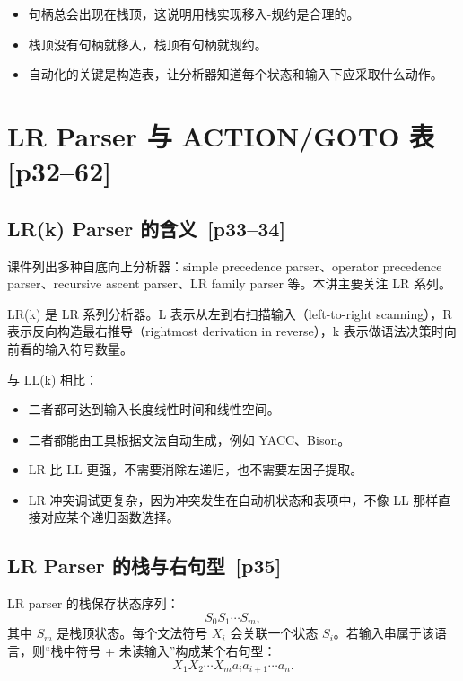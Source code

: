 \documentclass[UTF8,fontset=none,11pt]{ctexart}
\newenvironment{defbox}[1][]{%
  \par\medskip\noindent{\color{defrule}\rule{\linewidth}{1.1pt}}\par\nopagebreak
  \noindent{\bfseries\color{defrule}#1}\par\nopagebreak\smallskip}%
  {\par\nopagebreak\smallskip\noindent{\color{defrule}\rule{\linewidth}{0.4pt}}\par\medskip}
\newcommand{\pg}[1]{\texorpdfstring{{\small\color{graytext}\,[p#1]}}{ [p#1]}}
\begin{document}
\begin{itemize}
  \item 句柄总会出现在栈顶，这说明用栈实现移入-规约是合理的。
  \item 栈顶没有句柄就移入，栈顶有句柄就规约。
  \item 自动化的关键是构造表，让分析器知道每个状态和输入下应采取什么动作。
\end{itemize}

\section{LR Parser 与 ACTION/GOTO 表 \pg{32--62}}

\subsection{LR(k) Parser 的含义 \pg{33--34}}

课件列出多种自底向上分析器：simple precedence parser、operator precedence parser、recursive ascent parser、LR family parser 等。本讲主要关注 LR 系列。

\begin{defbox}[LR(k)]
LR(k) 是 LR 系列分析器。L 表示从左到右扫描输入（left-to-right scanning），R 表示反向构造最右推导（rightmost derivation in reverse），k 表示做语法决策时向前看的输入符号数量。
\end{defbox}

与 LL(k) 相比：

\begin{itemize}
  \item 二者都可达到输入长度线性时间和线性空间。
  \item 二者都能由工具根据文法自动生成，例如 YACC、Bison。
  \item LR 比 LL 更强，不需要消除左递归，也不需要左因子提取。
  \item LR 冲突调试更复杂，因为冲突发生在自动机状态和表项中，不像 LL 那样直接对应某个递归函数选择。
\end{itemize}

\subsection{LR Parser 的栈与右句型 \pg{35}}

LR parser 的栈保存状态序列：
\[
S_0S_1\cdots S_m,
\]
其中 \(S_m\) 是栈顶状态。每个文法符号 \(X_i\) 会关联一个状态 \(S_i\)。若输入串属于该语言，则“栈中符号 + 未读输入”构成某个右句型：
\[
X_1X_2\cdots X_m a_i a_{i+1}\cdots a_n.
\]
\end{document}
